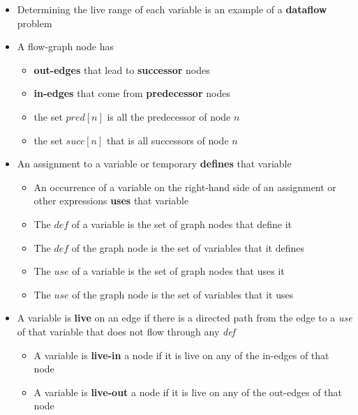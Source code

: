 \documentclass[11pt]{article}
\begin{document}
\begin{itemize}
\item Determining the live range of each variable is an example of a \textbf{dataflow} problem

\item A flow-graph node has
\begin{itemize}
\item \textbf{out-edges} that lead to \textbf{successor} nodes
\item \textbf{in-edges} that come from \textbf{predecessor} nodes
\item the set \(pred[n]\) is all the predecessor of node \(n\)
\item the set \(succ[n]\) that is all successors of node \(n\)
\end{itemize}

\item An assignment to a variable or temporary \textbf{defines} that variable
\begin{itemize}
\item An occurrence of a variable on the right-hand side of an assignment or other expressions \textbf{uses} that variable
\item The \(def\) of a variable is the set of graph nodes that define it
\item The \(def\) of the graph node is the set of variables that it defines
\item The \(use\) of a variable is the set of graph nodes that uses it
\item The \(use\) of the graph node is the set of variables that it uses
\end{itemize}

\item A variable is \textbf{live} on an edge if there is a directed path from the edge to a \emph{use} of that variable that does not flow through any \emph{def}
\begin{itemize}
\item A variable is \textbf{live-in} a node if it is live on any of the in-edges of that node
\item A variable is \textbf{live-out} a node if it is live on any of the out-edges of that node
\end{itemize}
\end{itemize}
\end{document}
